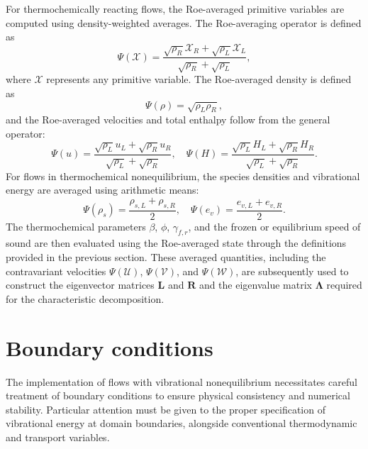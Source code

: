 For thermochemically reacting flows, the Roe-averaged primitive variables are computed using density-weighted averages. The Roe-averaging operator is defined as
\begin{equation}
\Psi(\mathcal{X}) = \frac{\sqrt{\rho_R}\mathcal{X}_R + \sqrt{\rho_L}\mathcal{X}_L}{\sqrt{\rho_R} + \sqrt{\rho_L}},
\end{equation}
where $\mathcal{X}$ represents any primitive variable. The Roe-averaged density is defined as
\begin{equation}
\Psi(\rho) = \sqrt{\rho_L \rho_R},
\end{equation}
and the Roe-averaged velocities and total enthalpy follow from the general operator:
\begin{equation}
\Psi(u) = \frac{\sqrt{\rho_L}u_L + \sqrt{\rho_R}u_R}{\sqrt{\rho_L} + \sqrt{\rho_R}}, \quad \Psi(H) = \frac{\sqrt{\rho_L}H_L + \sqrt{\rho_R}H_R}{\sqrt{\rho_L} + \sqrt{\rho_R}}.
\end{equation}
For flows in thermochemical nonequilibrium, the species densities and vibrational energy are averaged using arithmetic means:
\begin{equation}
\Psi(\rho_s) = \frac{\rho_{s,L} + \rho_{s,R}}{2}, \quad \Psi(e_v) = \frac{e_{v,L} + e_{v,R}}{2}.
\end{equation}
The thermochemical parameters $\beta$, $\phi$, $\gamma_{f,r}$, and the frozen or equilibrium speed of sound are then evaluated using the Roe-averaged state through the definitions provided in the previous section. These averaged quantities, including the contravariant velocities $\Psi(\mathcal{U})$, $\Psi(\mathcal{V})$, and $\Psi(\mathcal{W})$, are subsequently used to construct the eigenvector matrices $\mathbf{L}$ and $\mathbf{R}$ and the eigenvalue matrix $\mathbf{\Lambda}$ required for the characteristic decomposition.


\section{Boundary conditions}
The implementation of flows with vibrational nonequilibrium necessitates careful treatment of boundary conditions to ensure physical consistency and numerical stability. Particular attention must be given to the proper specification of vibrational energy at domain boundaries, alongside conventional thermodynamic and transport variables. 


